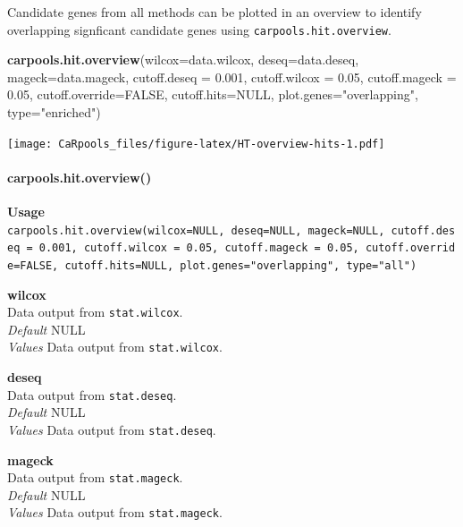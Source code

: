 \documentclass[]{article}
\newenvironment{Shaded}{\begin{snugshade}}{\end{snugshade}}
\newcommand{\KeywordTok}[1]{\textcolor[rgb]{0.13,0.29,0.53}{\textbf{{#1}}}}
\newcommand{\DataTypeTok}[1]{\textcolor[rgb]{0.13,0.29,0.53}{{#1}}}
\newcommand{\FloatTok}[1]{\textcolor[rgb]{0.00,0.00,0.81}{{#1}}}
\newcommand{\StringTok}[1]{\textcolor[rgb]{0.31,0.60,0.02}{{#1}}}
\newcommand{\OtherTok}[1]{\textcolor[rgb]{0.56,0.35,0.01}{{#1}}}
\newcommand{\NormalTok}[1]{{#1}}
\let\oldparagraph\paragraph
\renewcommand{\paragraph}[1]{\oldparagraph{#1}\mbox{}}
\begin{document}
Candidate genes from all methods can be plotted in an overview to
identify overlapping signficant candidate genes using
\texttt{carpools.hit.overview}.

\begin{Shaded}
\begin{Highlighting}[]
\KeywordTok{carpools.hit.overview}\NormalTok{(}\DataTypeTok{wilcox=}\NormalTok{data.wilcox, }\DataTypeTok{deseq=}\NormalTok{data.deseq, }\DataTypeTok{mageck=}\NormalTok{data.mageck,}
    \DataTypeTok{cutoff.deseq =} \FloatTok{0.001}\NormalTok{, }\DataTypeTok{cutoff.wilcox =} \FloatTok{0.05}\NormalTok{, }\DataTypeTok{cutoff.mageck =} \FloatTok{0.05}\NormalTok{,}
    \DataTypeTok{cutoff.override=}\OtherTok{FALSE}\NormalTok{, }\DataTypeTok{cutoff.hits=}\OtherTok{NULL}\NormalTok{, }\DataTypeTok{plot.genes=}\StringTok{"overlapping"}\NormalTok{, }\DataTypeTok{type=}\StringTok{"enriched"}\NormalTok{)}
\end{Highlighting}
\end{Shaded}

\texttt{[image: CaRpools\_files/figure-latex/HT-overview-hits-1.pdf]}

\paragraph{carpools.hit.overview()}\label{carpools.hit.overview}

\textbf{Usage}\\
\texttt{carpools.hit.overview(wilcox=NULL,\ deseq=NULL,\ mageck=NULL,\ cutoff.deseq\ =\ 0.001,\ cutoff.wilcox\ =\ 0.05,\ cutoff.mageck\ =\ 0.05,\ cutoff.override=FALSE,\ cutoff.hits=NULL,\ plot.genes="overlapping",\ type="all")}

\textbf{wilcox}\\
Data output from \texttt{stat.wilcox}.\\
\emph{Default} NULL\\
\emph{Values} Data output from \texttt{stat.wilcox}.

\textbf{deseq}\\
Data output from \texttt{stat.deseq}.\\
\emph{Default} NULL\\
\emph{Values} Data output from \texttt{stat.deseq}.

\textbf{mageck}\\
Data output from \texttt{stat.mageck}.\\
\emph{Default} NULL\\
\emph{Values} Data output from \texttt{stat.mageck}.
\end{document}
